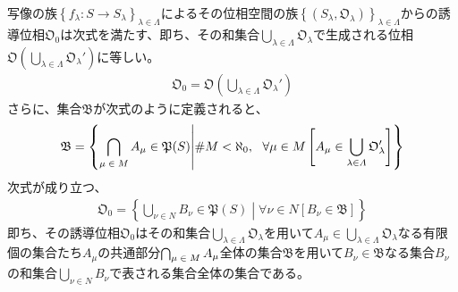 \documentclass[dvipdfmx]{jsarticle}
\begin{document}
\begin{thm}\label{8.1.4.5}
写像の族$\left\{ f_{\lambda}:S \rightarrow S_{\lambda} \right\}_{\lambda \in \varLambda}$によるその位相空間の族$\left\{ \left( S_{\lambda},\mathfrak{O}_{\lambda} \right) \right\}_{\lambda \in \varLambda}$からの誘導位相$\mathfrak{O}_{0}$は次式を満たす、即ち、その和集合$\bigcup_{\lambda \in \varLambda} \mathfrak{O}_{\lambda}$で生成される位相$\mathfrak{O}\left( \bigcup_{\lambda \in \varLambda} \mathfrak{O}_{\lambda}' \right)$に等しい。
\begin{align*}
\mathfrak{O}_{0} = \mathfrak{O}\left( \bigcup_{\lambda \in \varLambda} \mathfrak{O}_{\lambda}' \right)
\end{align*}
さらに、集合$\mathfrak{B}$が次式のように定義されると、
\begin{align*}
\mathfrak{B} = \left\{ \bigcap_{\scriptsize \begin{matrix}
\mu \in M \\
\end{matrix}} A_{\mu}\in \mathfrak{P}(S) \middle| {\#}M < \aleph_{0},\ \ \forall\mu \in M\left[ A_{\mu} \in \bigcup_{\lambda \in \varLambda} \mathfrak{O}_{\lambda}' \right] \right\}
\end{align*}
次式が成り立つ、
\begin{align*}
\mathfrak{O}_{0} = \left\{ \bigcup_{\nu \in N} B_{\nu}\in \mathfrak{P}(S) \middle| \forall\nu \in N\left[ B_{\nu}\in \mathfrak{B} \right] \right\}
\end{align*}
即ち、その誘導位相$\mathfrak{O}_{0}$はその和集合$\bigcup_{\lambda \in \varLambda} \mathfrak{O}_{\lambda}$を用いて$A_{\mu} \in \bigcup_{\lambda \in \varLambda} \mathfrak{O}_{\lambda}$なる有限個の集合たち$A_{\mu}$の共通部分$\bigcap_{\scriptsize \begin{matrix}
\mu \in M \\
\end{matrix}} A_{\mu}$全体の集合$\mathfrak{B}$を用いて$B_{\nu} \in \mathfrak{B}$なる集合$B_{\nu}$の和集合$\bigcup_{\nu \in N} B_{\nu}$で表される集合全体の集合である。
\end{thm}
\end{document}
